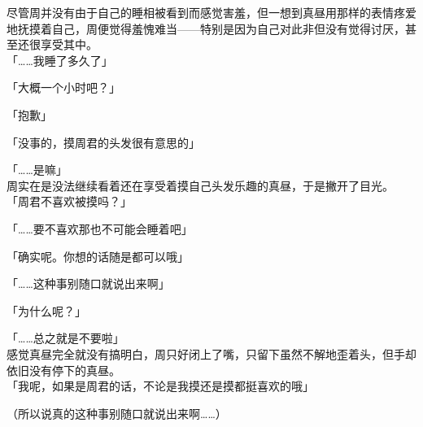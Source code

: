 尽管周并没有由于自己的睡相被看到而感觉害羞，但一想到真昼用那样的表情疼爱地抚摸着自己，周便觉得羞愧难当——特别是因为自己对此非但没有觉得讨厌，甚至还很享受其中。\\

「……我睡了多久了」

「大概一个小时吧？」

「抱歉」

「没事的，摸周君的头发很有意思的」

「……是嘛」\\

周实在是没法继续看着还在享受着摸自己头发乐趣的真昼，于是撇开了目光。\\

「周君不喜欢被摸吗？」

「……要不喜欢那也不可能会睡着吧」

「确实呢。你想的话随是都可以哦」

「……这种事别随口就说出来啊」

「为什么呢？」

「……总之就是不要啦」\\

感觉真昼完全就没有搞明白，周只好闭上了嘴，只留下虽然不解地歪着头，但手却依旧没有停下的真昼。\\

「我呢，如果是周君的话，不论是我摸还是摸都挺喜欢的哦」

（所以说真的这种事别随口就说出来啊……）\\

